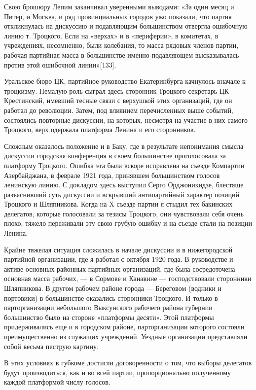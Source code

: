 \documentclass[12pt, a4paper, openany]{book}
\begin{document}
Свою брошюру Лепим заканчивал уверенными выводами: «За один месяц и Питер, и Москва, и ряд провинциальных городов ужо показали, что партия откликнулась на дискуссию и подавляющим большинством отвергла ошибочную линию т. Троцкого. Если на «верхах» и в «периферии», в комитетах, в учреждениях, несомненно, были колебания, то масса рядовых членов партии, рабочая партийная масса в большинстве именно подавляющем высказывалась против этой ошибочной линии»[133].

Уральское бюро ЦК, партийное руководство Екатеринбурга качнулось вначале к троцкизму. Немалую роль сыграл здесь сторонник Троцкого секретарь ЦК Крестинский, имевший тесные связи с верхушкой этих организаций, где он работал до революции. Затем, под влиянием перечисленных выше событий, состоялись повторные дискуссии, на которых, несмотря на участие в них самого Троцкого, верх одержала платформа Ленина и его сторонников.

Сложным оказалось положение и в Баку, где в результате непонимания смысла дискуссии городская конференция в своем большинстве проголосовала за платформу Троцкого. Ошибка эта была вскоре исправлена на съезде Компартии Азербайджана, в феврале 1921 года, принявшем большинством голосов ленинскую линию. С докладом здесь выступил Серго Орджоникидзе, блестяще разъяснивший суть дискуссии и вскрывший антипартийный характер позиций Троцкого и Шляпникова. Когда на X съезде партии я стыдил тех бакинских делегатов, которые голосовали за тезисы Троцкого, они чувствовали себя очень плохо, тяжело переживали эту свою грубую ошибку и на съезде стали на позиции Ленина.

Крайне тяжелая ситуация сложилась в начале дискуссии и в нижегородской партийной организации, где я работал с октября 1920 года. В руководстве и активе основных районных партийных организаций, где была сосредоточена основная масса рабочих, — в Сормове и Канавине — господствовали сторонники Шляпникова. В другом рабочем районе города — Береговом (водники и портовики) в большинстве оказались сторонники Троцкого. И только в парторганизации небольшого Выксунского рабочего района губернии большинство было на стороне «платформы десяти». Этой платформы придерживались еще и в городском районе, парторганизации которого состояли преимущественно из служащих учреждений. Уездные организации представляли собой весьма пеструю картину.

В этих условиях в губкоме достигли договоренности о том, что выборы делегатов будут производиться, как и во всей партии, пропорционально полученному каждой платформой числу голосов.
\end{document}
